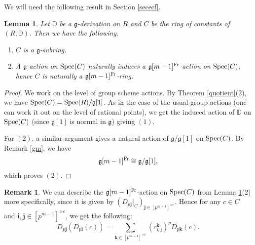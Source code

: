 \documentclass[10pt]{amsart}
\newtheorem{lemma}[theorem]{Lemma}
\theoremstyle{definition}
\newtheorem{remark}[theorem]{Remark}
\begin{document}
\noindent
We will need the following result in Section \ref{sececf}.
\begin{lemma}\label{deronc}
Let $\mathbb{D}$ be a $\mathfrak{g}$-derivation on $R$ and $C$ be the ring of constants of $(R,\mathbb{D})$. Then we have the following.
\begin{enumerate}
\item $C$ is a $\mathfrak{g}$-subring.

\item A $\mathfrak{g}$-action on $\operatorname{Spec}(C)$ naturally induces a $\mathfrak{g}[m-1]^{\operatorname{Fr}}$-action on $\operatorname{Spec}(C)$, hence $C$ is naturally a $\mathfrak{g}[m-1]^{\operatorname{Fr}}$-ring.
\end{enumerate}
\end{lemma}
\begin{proof}
We work on the level of group scheme actions. By Theorem \ref{quotient}(2), we have $\operatorname{Spec}(C)=\operatorname{Spec}(R)/\mathfrak{g}[1]$. As in the case of the usual group actions (one can work it out on the level of rational points), we get the induced action of $\mathbb{D}$ on $\operatorname{Spec}(C)$ (since $\mathfrak{g}[1]$ is normal in $\mathfrak{g}$) giving $(1)$.

For $(2)$, a similar argument gives a natural action of $\mathfrak{g}/\mathfrak{g}[1]$ on $\operatorname{Spec}(C)$. By Remark \ref{gm}, we have
$$\mathfrak{g}[m-1]^{\operatorname{Fr}}\cong \mathfrak{g}/\mathfrak{g}[1],$$
which proves $(2)$.
\end{proof}
\begin{remark}\label{dpidpj}
We can describe the $\mathfrak{g}[m-1]^{\operatorname{Fr}}$-action on $\operatorname{Spec}(C)$ from Lemma \ref{deronc}(2) more specifically, since it is given by
$(D_{p\mathbf{j}}|_C)_{\mathbf{j}\in [p^{m-1}]^{\times e}}$. Hence for any $c\in C$ and $\mathbf{i},\mathbf{j}\in [p^{m-1}]^{\times e}$, we get the following:
$$D_{p\mathbf{j}}(D_{p\mathbf{i}}(c))=\sum_{\mathbf{k}\in [p^{m-1}]^{\times e}}\left(c_{\mathbf{i},\mathbf{j}}^{\mathbf{k}}\right)^pD_{p\mathbf{k}}(c).$$
\end{remark}
\end{document}

